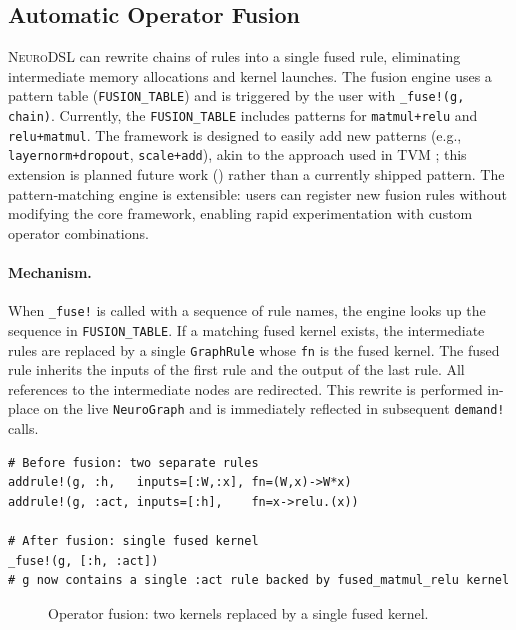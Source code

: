 \documentclass{article}
\begin{document}
\subsection{Automatic Operator Fusion}
\textsc{NeuroDSL} can rewrite chains of rules into a single fused rule, eliminating intermediate memory allocations and kernel launches. The fusion engine uses a pattern table (\texttt{FUSION\_TABLE}) and is triggered by the user with \texttt{\_fuse!(g, chain)}. Currently, the \texttt{FUSION\_TABLE} includes patterns for \texttt{matmul+relu} and \texttt{relu+matmul}. The framework is designed to easily add new patterns (e.g., \texttt{layernorm+dropout}, \texttt{scale+add}), akin to the approach used in TVM \cite{tvm}; this extension is planned future work () rather than a currently shipped pattern. The pattern‑matching engine is extensible: users can register new fusion rules without modifying the core framework, enabling rapid experimentation with custom operator combinations.

\paragraph{Mechanism.} When \texttt{\_fuse!} is called with a sequence of rule names, the engine looks up the sequence in \texttt{FUSION\_TABLE}. If a matching fused kernel exists, the intermediate rules are replaced by a single \texttt{GraphRule} whose \texttt{fn} is the fused kernel. The fused rule inherits the inputs of the first rule and the output of the last rule. All references to the intermediate nodes are redirected. This rewrite is performed in-place on the live \texttt{NeuroGraph} and is immediately reflected in subsequent \texttt{demand!} calls.

\begin{lstlisting}[caption={Operator fusion API}, label={lst:fusion}]
# Before fusion: two separate rules
addrule!(g, :h,   inputs=[:W,:x], fn=(W,x)->W*x)
addrule!(g, :act, inputs=[:h],    fn=x->relu.(x))

# After fusion: single fused kernel
_fuse!(g, [:h, :act])
# g now contains a single :act rule backed by fused_matmul_relu kernel
\end{lstlisting}

\begin{figure}[H]
\centering
{}
\caption{Operator fusion: two kernels replaced by a single fused kernel.}
\label{fig:fusion}
\end{figure}
\end{document}

